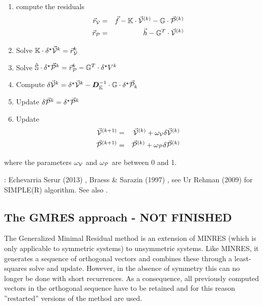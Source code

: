 \begin{mdframed}[backgroundcolor=blue!5]
\begin{enumerate}
\item compute the residuals 
\begin{eqnarray}
\vec{r}_{\cal V} &=& \vec{f} - {\mathbb{K}} \cdot \vec{\cal V}^{(k)} - {\mathbb{G}} \cdot \vec{\cal P}^{(k)} \nonumber\\
\vec{r}_{\cal P} &=& \vec{h} - {\mathbb{G}}^T \cdot \vec{\cal V}^{(k)}
\end{eqnarray}
\item Solve ${\mathbb{K}}  \cdot \delta^\star \vec{\cal V}^k =  \vec{r}_{\cal V}^k  $
\item Solve $\hat{{\mathbb{S}}} \cdot \delta^\star \vec{\cal P}^k =  \vec{r}_{\cal P}^k - {\mathbb{G}}^T \cdot  \delta^\star V^k $
\item Compute $\delta \vec{\cal V}^k = \delta^\star \vec{\cal V}^k -{\bm D}_{\mathbb{K}}^{-1} \cdot {\mathbb{G}} \cdot \delta^\star \vec{\cal P}_k $
\item Update $\delta \vec{\cal P}^k = \delta^\star \vec{\cal P}^k$
\item Update 
\begin{eqnarray}
\vec{\cal V}^{(k+1)} &=& \vec{\cal V}^{(k)} + \omega_{\cal V} \delta \vec{\cal V}^{(k)} \nonumber\\
\vec{\cal P}^{(k+1)} &=& \vec{\cal P}^{(k)} + \omega_{\cal P} \delta \vec{\cal P}^{(k)} 
\end{eqnarray}
\end{enumerate}
\end{mdframed}
where the parameters $\omega_{\cal V}$ and $\omega_{\cal P}$ are between 0 and 1. 

\Literature: Echevarria Serur (2013) \cite{eche13}, Braess \& Sarazin (1997) \cite{brsa97b}, 
see Ur Rehman \etal (2009) \cite{urvs09} for SIMPLE(R) algorithm. See also \cite{tack10}.
















\subsection{The GMRES approach - NOT FINISHED}

The Generalized Minimal Residual method \cite{sasc86} 
is an extension of MINRES (which is only applicable to symmetric systems) 
to unsymmetric systems. 
Like MINRES, it generates a sequence of orthogonal vectors and 
combines these through a least-squares solve and update. However, 
in the absence of symmetry this can no longer be done with short recurrences. As a consequence, 
all previously computed vectors in the orthogonal sequence have to be retained and 
for this reason ''restarted'' versions of the method are used.

